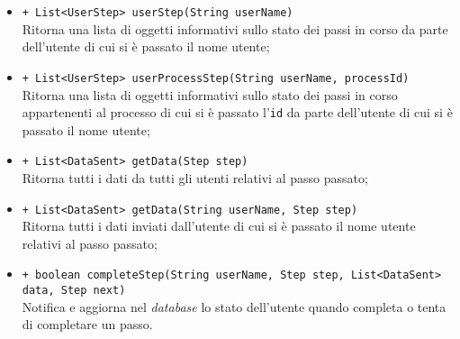 \begin{flushleft}
\begin{itemize}
\begin{sloppypar}
\begin{itemize}
\item \texttt{+ List<UserStep> userStep(String userName)}\\ Ritorna una lista di oggetti informativi sullo stato dei passi in corso da parte dell'utente di cui si è passato il nome utente;
\item \texttt{+ List<UserStep> userProcessStep(String userName, processId)}\\ Ritorna una lista di oggetti informativi sullo stato dei passi in corso appartenenti al processo di cui si è passato l'\texttt{id} da parte dell'utente di cui si è passato il nome utente;
\item \texttt{+ List<DataSent> getData(Step step)}\\ Ritorna tutti i dati da tutti gli utenti relativi al passo passato;
\item \texttt{+ List<DataSent> getData(String userName, Step step)}\\ Ritorna tutti i dati inviati dall'utente di cui si è passato il nome utente relativi al passo passato;
\item \texttt{+ boolean completeStep(String userName, Step step, List<DataSent> data, Step next)}\\Notifica e aggiorna nel \textit{database} lo stato dell'utente quando completa o tenta di completare un passo.
\end{itemize}
\end{sloppypar}
\end{itemize}
\end{flushleft}

